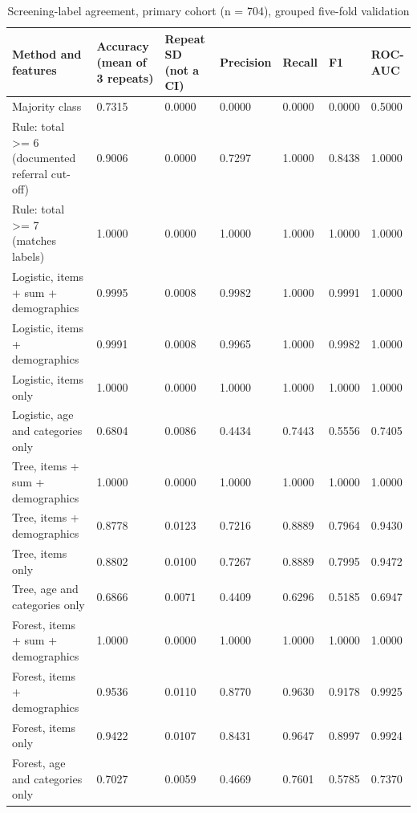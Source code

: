 \begin{table}
\caption{Screening-label agreement, primary cohort (n = 704), grouped five-fold validation}
\label{tab:table1_main_results}
\begin{tabular}{lllllll}
\toprule
Method and features & Accuracy (mean of 3 repeats) & Repeat SD (not a CI) & Precision & Recall & F1 & ROC-AUC \\
\midrule
Majority class & 0.7315 & 0.0000 & 0.0000 & 0.0000 & 0.0000 & 0.5000 \\
Rule: total >= 6 (documented referral cut-off) & 0.9006 & 0.0000 & 0.7297 & 1.0000 & 0.8438 & 1.0000 \\
Rule: total >= 7 (matches labels) & 1.0000 & 0.0000 & 1.0000 & 1.0000 & 1.0000 & 1.0000 \\
Logistic, items + sum + demographics & 0.9995 & 0.0008 & 0.9982 & 1.0000 & 0.9991 & 1.0000 \\
Logistic, items + demographics & 0.9991 & 0.0008 & 0.9965 & 1.0000 & 0.9982 & 1.0000 \\
Logistic, items only & 1.0000 & 0.0000 & 1.0000 & 1.0000 & 1.0000 & 1.0000 \\
Logistic, age and categories only & 0.6804 & 0.0086 & 0.4434 & 0.7443 & 0.5556 & 0.7405 \\
Tree, items + sum + demographics & 1.0000 & 0.0000 & 1.0000 & 1.0000 & 1.0000 & 1.0000 \\
Tree, items + demographics & 0.8778 & 0.0123 & 0.7216 & 0.8889 & 0.7964 & 0.9430 \\
Tree, items only & 0.8802 & 0.0100 & 0.7267 & 0.8889 & 0.7995 & 0.9472 \\
Tree, age and categories only & 0.6866 & 0.0071 & 0.4409 & 0.6296 & 0.5185 & 0.6947 \\
Forest, items + sum + demographics & 1.0000 & 0.0000 & 1.0000 & 1.0000 & 1.0000 & 1.0000 \\
Forest, items + demographics & 0.9536 & 0.0110 & 0.8770 & 0.9630 & 0.9178 & 0.9925 \\
Forest, items only & 0.9422 & 0.0107 & 0.8431 & 0.9647 & 0.8997 & 0.9924 \\
Forest, age and categories only & 0.7027 & 0.0059 & 0.4669 & 0.7601 & 0.5785 & 0.7370 \\
\bottomrule
\end{tabular}
\end{table}
